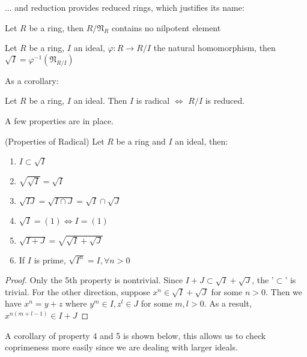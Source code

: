 \documentclass{note-eng}
\begin{document}
... and reduction provides reduced rings, which justifies its name:

\begin{proposition}
    Let $R$ be a ring, then $R / \mathfrak{N}_R$ contains no nilpotent element
\end{proposition}

\begin{proposition} \label{prop:calc-radical-quotient}
    Let $R$ be a ring, $I$ an ideal, $\varphi: R \rightarrow R / I$ the natural homomorphism, then $\sqrt{I} = \varphi ^{-1}(\mathfrak{N}_{R / I})$
\end{proposition}

As a corollary:

\begin{corollary}
    Let $R$ be a ring, $I$ an ideal. Then $I$ is radical $\Leftrightarrow$ $R / I$ is reduced.
\end{corollary}

A few properties are in place.

\begin{proposition}
    (Properties of Radical) Let $R$ be a ring and $I$ an ideal, then:
    \begin{enumerate}
        \item $I \subset \sqrt{I}$
        \item $\sqrt{\sqrt{I}} = \sqrt{I}$
        \item $\sqrt{IJ} = \sqrt{I \cap J} = \sqrt{I} \cap \sqrt{J}$
        \item $\sqrt{I} = (1) \Leftrightarrow I = (1)$
        \item $\sqrt{I + J} = \sqrt{\sqrt{I} + \sqrt{J}}$
        \item If $I$ is prime, $\sqrt{I^n} = I, \forall n \gt 0$
    \end{enumerate}
\end{proposition}

\begin{proof}
    Only the 5th property is nontrivial. Since $I + J \subset \sqrt{I} + \sqrt{J}$, the '$\subset$' is trivial. For the other direction, suppose $x^n \in \sqrt{I} + \sqrt{J}$ for some $n \gt 0$. Then we have $x^n = y + z$ where $y^m \in I, z^l \in J$ for some $m, l \gt 0$. As a result, $x^{n(m + l - 1)} \in I + J$
\end{proof}

A corollary of property 4 and 5 is shown below, this allows us to check coprimeness more easily since we are dealing with larger ideals.
\end{document}
